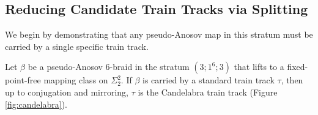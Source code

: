 \subsection{Reducing Candidate Train Tracks via Splitting}

We begin by demonstrating that any pseudo-Anosov map in this stratum must be carried by a single specific train track.

\begin{lemma}\label{lem:candelabra_reduction}
    Let $\beta$ be a pseudo-Anosov 6-braid in the stratum $(3;1^6;3)$ that lifts to a fixed-point-free mapping class on $\Sigma_2^2$. If $\beta$ is carried by a standard train track $\tau$, then up to conjugation and mirroring, $\tau$ is the Candelabra train track (Figure \ref{fig:candelabra}).
\end{lemma}

